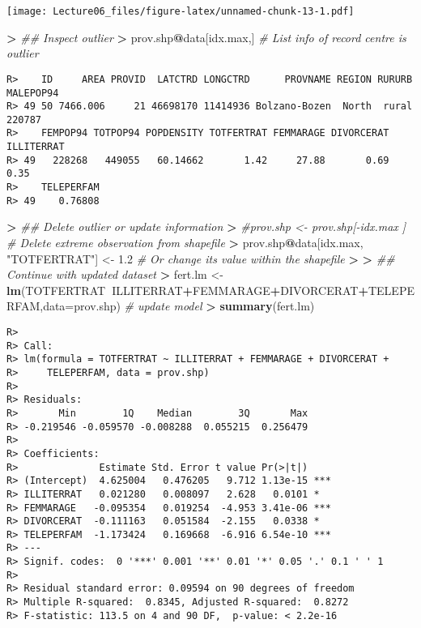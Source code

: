 \documentclass[
]{article}
\newenvironment{Shaded}{\begin{snugshade}}{\end{snugshade}}
\newcommand{\CommentTok}[1]{\textcolor[rgb]{0.56,0.35,0.01}{\textit{#1}}}
\newcommand{\DataTypeTok}[1]{\textcolor[rgb]{0.13,0.29,0.53}{#1}}
\newcommand{\ErrorTok}[1]{\textcolor[rgb]{0.64,0.00,0.00}{\textbf{#1}}}
\newcommand{\FloatTok}[1]{\textcolor[rgb]{0.00,0.00,0.81}{#1}}
\newcommand{\KeywordTok}[1]{\textcolor[rgb]{0.13,0.29,0.53}{\textbf{#1}}}
\newcommand{\NormalTok}[1]{#1}
\newcommand{\OperatorTok}[1]{\textcolor[rgb]{0.81,0.36,0.00}{\textbf{#1}}}
\newcommand{\StringTok}[1]{\textcolor[rgb]{0.31,0.60,0.02}{#1}}
\begin{document}
\texttt{[image: Lecture06\_files/figure-latex/unnamed-chunk-13-1.pdf]}

\begin{Shaded}
\begin{Highlighting}[]
\OperatorTok{>}\StringTok{ }\CommentTok{## Inspect outlier}
\ErrorTok{>}\StringTok{ }\NormalTok{prov.shp}\OperatorTok{@}\NormalTok{data[idx.max,]                      }\CommentTok{# List info of record centre is outlier}
\end{Highlighting}
\end{Shaded}

\begin{verbatim}
R>    ID     AREA PROVID  LATCTRD LONGCTRD      PROVNAME REGION RURURB MALEPOP94
R> 49 50 7466.006     21 46698170 11414936 Bolzano-Bozen  North  rural    220787
R>    FEMPOP94 TOTPOP94 POPDENSITY TOTFERTRAT FEMMARAGE DIVORCERAT ILLITERRAT
R> 49   228268   449055   60.14662       1.42     27.88       0.69       0.35
R>    TELEPERFAM
R> 49    0.76808
\end{verbatim}

\begin{Shaded}
\begin{Highlighting}[]
\OperatorTok{>}\StringTok{ }\CommentTok{## Delete outlier or update information}
\ErrorTok{>}\StringTok{ }\CommentTok{#prov.shp <- prov.shp[-idx.max ]             # Delete extreme observation from shapefile }
\ErrorTok{>}\StringTok{ }\NormalTok{prov.shp}\OperatorTok{@}\NormalTok{data[idx.max, }\StringTok{"TOTFERTRAT"}\NormalTok{] <-}\StringTok{ }\FloatTok{1.2}  \CommentTok{# Or change its value within the shapefile}
\OperatorTok{>}\StringTok{ }
\ErrorTok{>}\StringTok{ }\CommentTok{## Continue with updated dataset}
\ErrorTok{>}\StringTok{ }\NormalTok{fert.lm <-}\StringTok{ }\KeywordTok{lm}\NormalTok{(TOTFERTRAT}\OperatorTok{~}\NormalTok{ILLITERRAT}\OperatorTok{+}\NormalTok{FEMMARAGE}\OperatorTok{+}\NormalTok{DIVORCERAT}\OperatorTok{+}\NormalTok{TELEPERFAM,}\DataTypeTok{data=}\NormalTok{prov.shp) }\CommentTok{# update model}
\OperatorTok{>}\StringTok{ }\KeywordTok{summary}\NormalTok{(fert.lm)}
\end{Highlighting}
\end{Shaded}

\begin{verbatim}
R> 
R> Call:
R> lm(formula = TOTFERTRAT ~ ILLITERRAT + FEMMARAGE + DIVORCERAT + 
R>     TELEPERFAM, data = prov.shp)
R> 
R> Residuals:
R>       Min        1Q    Median        3Q       Max 
R> -0.219546 -0.059570 -0.008288  0.055215  0.256479 
R> 
R> Coefficients:
R>              Estimate Std. Error t value Pr(>|t|)    
R> (Intercept)  4.625004   0.476205   9.712 1.13e-15 ***
R> ILLITERRAT   0.021280   0.008097   2.628   0.0101 *  
R> FEMMARAGE   -0.095354   0.019254  -4.953 3.41e-06 ***
R> DIVORCERAT  -0.111163   0.051584  -2.155   0.0338 *  
R> TELEPERFAM  -1.173424   0.169668  -6.916 6.54e-10 ***
R> ---
R> Signif. codes:  0 '***' 0.001 '**' 0.01 '*' 0.05 '.' 0.1 ' ' 1
R> 
R> Residual standard error: 0.09594 on 90 degrees of freedom
R> Multiple R-squared:  0.8345, Adjusted R-squared:  0.8272 
R> F-statistic: 113.5 on 4 and 90 DF,  p-value: < 2.2e-16
\end{verbatim}
\end{document}

